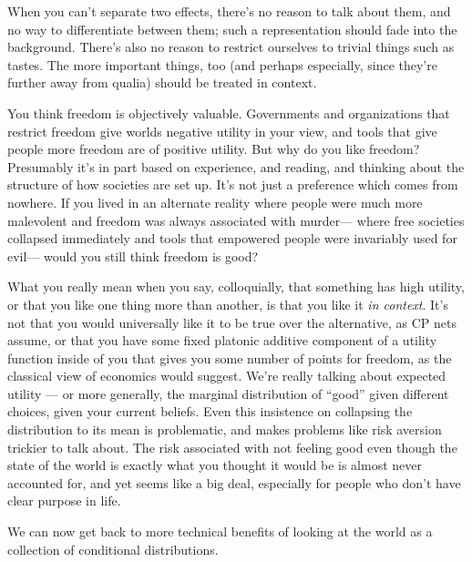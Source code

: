 \documentclass{article}
\begin{document}
	When you can't separate two effects, there's no reason to talk about them, and no way to differentiate between them; such a representation should fade into the background. There's also no reason to restrict ourselves to trivial things such as tastes. The more important things, too (and perhaps especially, since they're further away from qualia) should be treated in context.
	
	\begin{example}
		You think freedom is objectively valuable. Governments and organizations that restrict freedom give worlds negative utility in your view, and tools that give people more freedom are of positive utility. But why do you like freedom? Presumably it's in part based on experience, and reading, and thinking about the structure of how societies are set up. It's not just a preference which comes from nowhere. If you lived in an alternate reality where people were much more malevolent and freedom was always associated with murder--- where free societies collapsed immediately and tools that empowered people were invariably used for evil--- would you still think freedom is good?
	\end{example}

	What you really mean when you say, colloquially, that something has high utility, or that you like one thing more than another, is that you like it \emph{in context}. It's not that you would universally like it to be true over the alternative, as CP nets assume, or that you have some fixed platonic additive component of a utility function inside of you that gives you some number of points for freedom, as the classical view of economics would suggest. We're really talking about expected utility --- or more generally, the marginal distribution of ``good'' given different choices, given your current beliefs. Even this insistence on collapsing the distribution to its mean is problematic, and makes problems like risk aversion trickier to talk about. The risk associated with not feeling good even though the state of the world is exactly what you thought it would be is almost never accounted for, and yet seems like a big deal, especially for people who don't have clear purpose in life.
	
	We can now get back to more technical benefits of looking at the world as a collection of conditional distributions.
\end{document}
